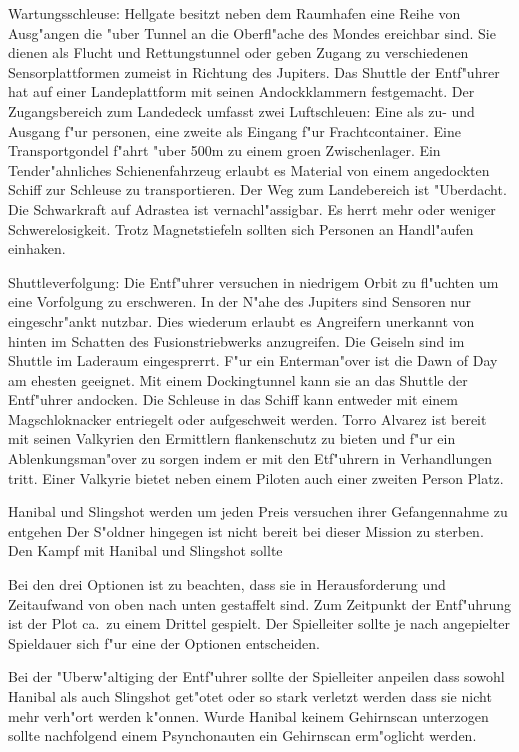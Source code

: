 Wartungsschleuse: Hellgate besitzt neben dem Raumhafen eine Reihe von Ausg"angen die "uber Tunnel an die Oberfl"ache des Mondes ereichbar sind. Sie dienen als Flucht und Rettungstunnel oder geben Zugang zu verschiedenen Sensorplattformen zumeist in Richtung des Jupiters. Das Shuttle der Entf"uhrer hat auf einer Landeplattform mit seinen Andockklammern festgemacht. Der Zugangsbereich zum Landedeck umfasst zwei Luftschleu\3en: Eine als zu- und Ausgang f"ur personen, eine zweite als Eingang f"ur Frachtcontainer. Eine Transportgondel f"ahrt "uber 500m zu einem gro\3en Zwischenlager. Ein Tender"ahnliches Schienenfahrzeug erlaubt es Material von einem angedockten Schiff zur Schleuse zu transportieren. Der Weg zum Landebereich ist "Uberdacht.  Die Schwarkraft auf Adrastea ist vernachl"assigbar. Es herrt mehr oder weniger Schwerelosigkeit. Trotz Magnetstiefeln sollten sich Personen an Handl"aufen einhaken.

Shuttleverfolgung: Die Entf"uhrer versuchen in niedrigem Orbit zu fl"uchten um eine Vorfolgung zu erschweren. In der N"ahe des Jupiters sind Sensoren nur eingeschr"ankt nutzbar. Dies wiederum erlaubt es Angreifern unerkannt von hinten im Schatten des Fusionstriebwerks anzugreifen. Die Geiseln sind im Shuttle im Laderaum eingesprerrt. F"ur ein Enterman"over ist die Dawn of Day am ehesten geeignet. Mit einem Dockingtunnel kann sie an das Shuttle der Entf"uhrer andocken. Die Schleuse in das Schiff kann entweder mit einem Magschlo\3knacker entriegelt oder aufgeschwei\3t werden. Torro Alvarez ist bereit mit seinen Valkyrien den Ermittlern flankenschutz zu bieten und f"ur ein Ablenkungsman"over zu sorgen indem er mit den Etf"uhrern in Verhandlungen tritt. Einer Valkyrie bietet neben einem Piloten auch einer zweiten Person Platz.

Hanibal und Slingshot werden um jeden Preis versuchen ihrer Gefangennahme zu entgehen Der S"oldner hingegen ist nicht bereit bei dieser Mission zu sterben. Den Kampf mit Hanibal und Slingshot sollte

\begin{remarks}
	Bei den drei Optionen ist zu beachten, dass sie in Herausforderung und Zeitaufwand von oben nach unten gestaffelt sind. Zum Zeitpunkt der Entf"uhrung ist der Plot ca.~zu einem Drittel gespielt. Der Spielleiter sollte je nach angepielter Spieldauer sich f"ur eine der Optionen entscheiden.

	Bei der "Uberw"altiging der Entf"uhrer sollte der Spielleiter anpeilen dass sowohl Hanibal als auch Slingshot get"otet oder so stark verletzt werden dass sie nicht mehr verh"ort werden k"onnen. Wurde Hanibal keinem Gehirnscan unterzogen sollte nachfolgend einem Psynchonauten ein Gehirnscan erm"oglicht werden.
\end{remarks}


